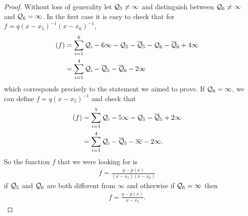 \documentclass[english,11pt,a4paper]{article}
\begin{document}
\begin{proof}

  Without loss of generality let $\mathcal{Q}_5 \neq \infty$ and distinguish between $\mathcal{Q}_6 \neq \infty$ and $\mathcal{Q}_6 = \infty$. In the first case it is easy to check that for $f = q (x - x_5)^{-1}(x - x_6)^{-1}$\hspace{-3.9mm},
  \begin{align*}
    (f) &= \sum_{i=1}^6 \mathcal{Q}_i - 6 \infty - \mathcal{Q}_5 - \overline {\mathcal{Q}}_5 - \mathcal{Q}_6 - \overline {\mathcal{Q}}_6 + 4 \infty \\
        &= \sum_{i=1}^4 \mathcal{Q}_i- \overline {\mathcal{Q}}_5 - \overline {\mathcal{Q}}_6 - 2 \infty
  \end{align*}
  which corresponds precisely to the statement we aimed to prove. If $\mathcal{Q}_6 = \infty$, we can define $f = q (x - x_5)^{-1}$ and check that
  \begin{align*}
    (f) &= \sum_{i=1}^5 \mathcal{Q}_i - 5 \infty - \mathcal{Q}_5 - \overline {\mathcal{Q}}_5 + 2 \infty \\
        &= \sum_{i=1}^4 \mathcal{Q}_i - \overline {\mathcal{Q}}_5 - \overline \infty - 2 \infty.
  \end{align*}
  So the function $f$ that we were looking for is
  \begin{align*}
    f = \frac{y-p(x)}{(x-x_5)(x-x_6)}
  \end{align*}
  if $\mathcal{Q}_5$ and $\mathcal{Q}_6$ are both different from $\infty$ and otherwise if $\mathcal{Q}_6 = \infty$ then
  \begin{align*}
    f = \frac{y-p(x)}{x-x_5}.
  \end{align*}
\end{proof}
\end{document}
